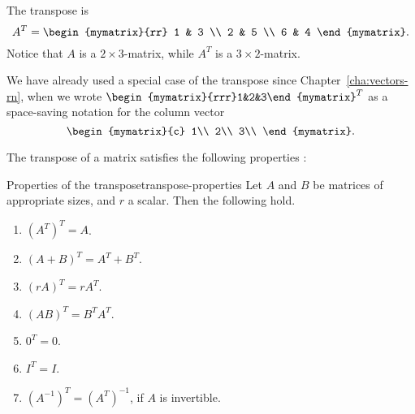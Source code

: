 \begin{solution}
  The transpose is
  \begin{equation*}
    A^T =
    \begin{mymatrix}{rr}
      1 & 3 \\
      2 & 5 \\
      6 & 4
    \end{mymatrix}.
  \end{equation*}
  Notice that $A$ is a $2\times 3$-matrix, while $A^T$ is a
  $3\times 2$-matrix.
\end{solution}

We have already used a special case of the transpose since
Chapter~\ref{cha:vectors-rn}, when we wrote
$\begin{mymatrix}{rrr}1&2&3\end{mymatrix}^T$ as a space-saving
notation for the column vector
\begin{equation*}
  \begin{mymatrix}{c}
    1\\
    2\\
    3\\
  \end{mymatrix}.
\end{equation*}

The transpose of a matrix satisfies the following
properties%
%
%
:

\begin{lemma}{Properties of the transpose}{transpose-properties}
  Let $A$ and $B$ be matrices of appropriate sizes, and $r$ a
  scalar. Then the following hold.
  \begin{enumerate}
  \item $(A^{T})^{T} = A$.
  \item $(A+B)^{T}=A^{T}+B^{T}$.\label{matrix-transpose-2}
  \item $(rA)^{T}=rA^{T}$.\label{matrix-transpose-3}
  \item $(AB)^{T}=B^{T}A^{T}$.\label{matrix-transpose-4}
  \item $0^{T} = 0$.
  \item $I^{T} = I$.
  \item $(A^{-1})^{T} = (A^{T})^{-1}$, if $A$ is invertible.
  \end{enumerate}
\end{lemma}

